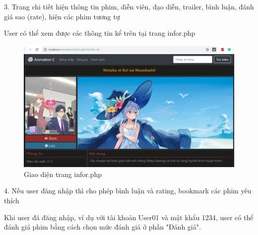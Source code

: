 \documentclass{report}
\begin{document}
\changefontsizes{14pt}
\setlength{\parindent}{0cm}
3. Trang chi tiết hiện thông tin phim, diễn viên, đạo diễn, trailer, bình luận, đánh giá sao (rate), hiện các phim tương tự

\changefontsizes{13pt}
\setlength{\parindent}{1cm}
User có thể xem được các thông tin kể trên tại trang infor.php

\begin{center}
    \begin{figure}[htp]
    \begin{center}
     \includegraphics[scale=0.45]{4.png}
    \end{center}
    \caption{Giao diện trang infor.php}
    \label{refhinh1}
    \end{figure}
\end{center}

\newpage
\changefontsizes{14pt}
\setlength{\parindent}{0cm}
4. Nếu user đăng nhập thì cho phép bình luận và rating, bookmark các phim yêu thích

\changefontsizes{13pt}
\setlength{\parindent}{1cm}
Khi user đã đăng nhập, ví dụ với tài khoản User01 và mật khẩu 1234, user có thể đánh giá phim bằng cách chọn mức đánh giá ở phần "Đánh giá".
\end{document}
